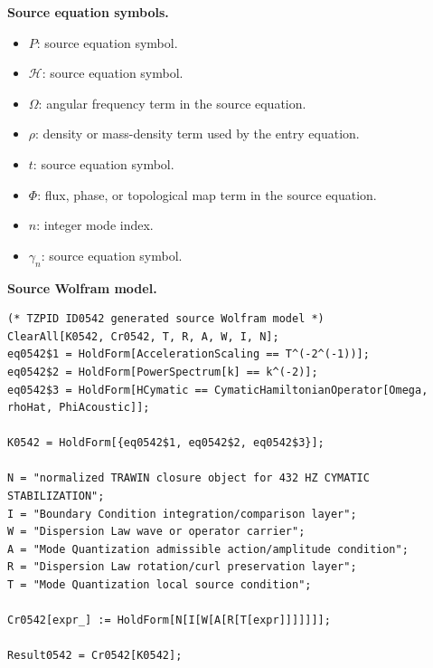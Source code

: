 \begin{minipage}[t]{0.49\linewidth}
\begingroup
\small
\raggedright
\textbf{Source equation symbols.}\par
\begin{itemize}[leftmargin=1.35em,itemsep=1pt,topsep=1pt,parsep=0pt]
    \item $P$: source equation symbol.
    \item $\mathcal{H}$: source equation symbol.
    \item $\Omega$: angular frequency term in the source equation.
    \item $\rho$: density or mass-density term used by the entry equation.
    \item $t$: source equation symbol.
    \item $\Phi$: flux, phase, or topological map term in the source equation.
    \item $n$: integer mode index.
    \item $\gamma_n$: source equation symbol.
\end{itemize}
\endgroup
\end{minipage}\hfill
\begin{minipage}[t]{0.47\linewidth}
\begingroup
\scriptsize
\raggedright
\textbf{Source Wolfram model.}\par
\begin{Verbatim}[fontsize=\tiny,breaklines=true,breakanywhere=true]
(* TZPID ID0542 generated source Wolfram model *)
ClearAll[K0542, Cr0542, T, R, A, W, I, N];
eq0542$1 = HoldForm[AccelerationScaling == T^(-2^(-1))];
eq0542$2 = HoldForm[PowerSpectrum[k] == k^(-2)];
eq0542$3 = HoldForm[HCymatic == CymaticHamiltonianOperator[Omega, rhoHat, PhiAcoustic]];

K0542 = HoldForm[{eq0542$1, eq0542$2, eq0542$3}];

N = "normalized TRAWIN closure object for 432 HZ CYMATIC STABILIZATION";
I = "Boundary Condition integration/comparison layer";
W = "Dispersion Law wave or operator carrier";
A = "Mode Quantization admissible action/amplitude condition";
R = "Dispersion Law rotation/curl preservation layer";
T = "Mode Quantization local source condition";

Cr0542[expr_] := HoldForm[N[I[W[A[R[T[expr]]]]]]];

Result0542 = Cr0542[K0542];
\end{Verbatim}
\endgroup
\end{minipage}

